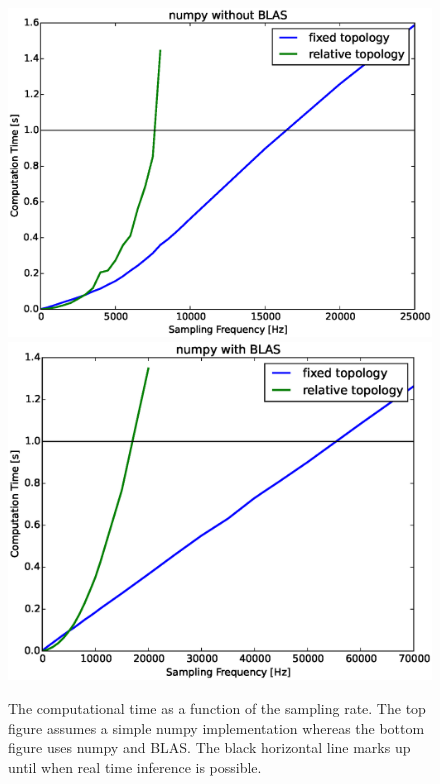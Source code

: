 \begin{figure}[!ht]
\centering
\includegraphics[width=0.75\linewidth]{bolt/sampling_freq.eps}
\includegraphics[width=0.75\linewidth]{bolt/sampling_freq_blas.eps}
\caption[BOLT: Computational time as a function of the sampling rate.]{The computational time as a function of the sampling rate. The top figure assumes a simple numpy implementation whereas the bottom figure uses numpy and BLAS. The black horizontal line marks up until when real time inference is possible.}
\label{fig_imp}
\end{figure}

